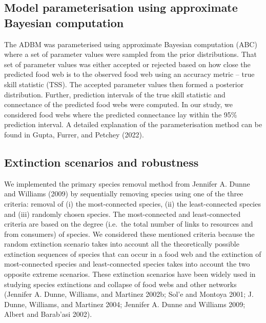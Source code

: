 \documentclass{article}
\begin{document}
\hypertarget{model-parameterisation-using-approximate-bayesian-computation}{%
\subsection{Model parameterisation using approximate Bayesian
computation}\label{model-parameterisation-using-approximate-bayesian-computation}}

The ADBM was parameterised using approximate Bayesian computation (ABC)
where a set of parameter values were sampled from the prior
distributions. That set of parameter values was either accepted or
rejected based on how close the predicted food web is to the observed
food web using an accuracy metric -- true skill statistic (TSS). The
accepted parameter values then formed a posterior distribution. Further,
prediction intervals of the true skill statistic and connectance of the
predicted food webs were computed. In our study, we considered food webs
where the predicted connectance lay within the 95\% prediction interval.
A detailed explanation of the parameterisation method can be found in
Gupta, Furrer, and Petchey (2022).

\hypertarget{extinction-scenarios-and-robustness}{%
\subsection{Extinction scenarios and
robustness}\label{extinction-scenarios-and-robustness}}

We implemented the primary species removal method from Jennifer A. Dunne
and Williams (2009) by sequentially removing species using one of the
three criteria: removal of (i) the most-connected species, (ii) the
least-connected species and (iii) randomly chosen species. The
most-connected and least-connected criteria are based on the degree
(i.e.~the total number of links to resources and from consumers) of
species. We considered these mentioned criteria because the random
extinction scenario takes into account all the theoretically possible
extinction sequences of species that can occur in a food web and the
extinction of most-connected species and least-connected species takes
into account the two opposite extreme scenarios. These extinction
scenarios have been widely used in studying species extinctions and
collapse of food webs and other networks (Jennifer A. Dunne, Williams,
and Martinez 2002b; Sol'e and Montoya 2001; J. Dunne, Williams, and
Martinez 2004; Jennifer A. Dunne and Williams 2009; Albert and Barab'asi
2002).
\end{document}
